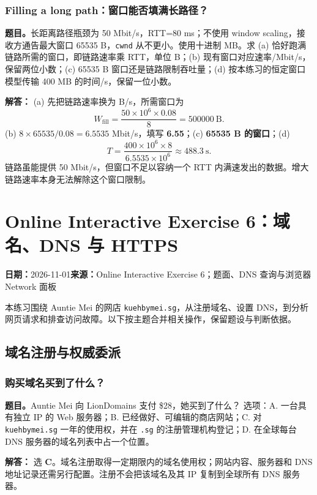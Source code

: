 \documentclass[11pt,a4paper,fontset=fandol]{ctexart}
\renewcommand{\exercisequestion}[2]{%
  \Needspace{5\baselineskip}%
  \subsubsection{#2}\label{exercise:#1}%
}
\renewcommand{\exercisemeta}[5]{%
  {\small\textbf{日期：}#2\quad\textbf{来源：}#3\par}%
}
\renewenvironment{checkedsolution}
  {\par\nopagebreak[4]\textbf{解答：}\ignorespaces}
  {\par}
\begin{document}
\exercisequestion{SC2008-HW05-Q11}{Filling a long path：窗口能否填满长路径？}
\textbf{题目。}长距离路径瓶颈为 50 Mbit/s，RTT=80 ms；不使用 window scaling，接收方通告最大窗口 65535 B，\texttt{cwnd} 从不更小。使用十进制 MB。求 (a) 恰好跑满链路所需的窗口，即链路速率乘 RTT，单位 B；(b) 现有窗口对应速率/Mbit/s，保留两位小数；(c) 65535 B 窗口还是链路限制吞吐量；(d) 按本练习的恒定窗口模型传输 400 MB 的时间/s，保留一位小数。
\begin{checkedsolution}
(a) 先把链路速率换为 B/s，所需窗口为
\[
 W_{\mathrm{fill}}=\frac{50\times10^6\times0.08}{8}
 =\boxed{500000\ \mathrm{B}}.
\]
(b) $8\times65535/0.08=6.5535$ Mbit/s，填写 \textbf{6.55}；(c) \textbf{65535 B 的窗口}；(d)
\[
 T=\frac{400\times10^6\times8}{6.5535\times10^6}
 \approx\boxed{488.3\ \mathrm{s}}.
\]
链路虽能提供 50 Mbit/s，但窗口不足以容纳一个 RTT 内满速发出的数据。增大链路速率本身无法解除这个窗口限制。
\end{checkedsolution}

\section{Online Interactive Exercise 6：域名、DNS 与 HTTPS}
\label{homework:SC2008-HW06}
\exercisemeta
  {SC2008-HW06}
  {2026-11-01}
  {Online Interactive Exercise 6；题面、DNS 查询与浏览器 Network 面板}
  {已完成；按题面与反馈核对}
  {已确认完成}

本练习围绕 Auntie Mei 的网店 \texttt{kuehbymei.sg}，从注册域名、设置 DNS，到分析网页请求和排查访问故障。以下按主题合并相关操作，保留题设与判断依据。

\subsection{域名注册与权威委派}

\exercisequestion{SC2008-HW06-Q01}{购买域名买到了什么？}
\textbf{题目。}Auntie Mei 向 LionDomains 支付 \$28，她买到了什么？
选项：A. 一台具有独立 IP 的 Web 服务器；B. 已经做好、可编辑的商店网站；C. 对 \texttt{kuehbymei.sg} 一年的使用权，并在 \texttt{.sg} 的注册管理机构登记；D. 在全球每台 DNS 服务器的域名列表中占一个位置。
\begin{checkedsolution}
选 \textbf{C}。域名注册取得一定期限内的域名使用权；网站内容、服务器和 DNS 地址记录还需另行配置。注册不会把该域名及其 IP 复制到全球所有 DNS 服务器。
\end{checkedsolution}
\end{document}
